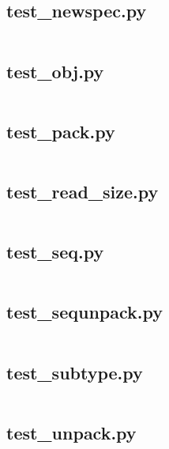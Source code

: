 \documentclass{article}
\begin{document}
\subsection{test\_newspec.py}
\inputminted{python}{/home/dufferzafar/dev/@clones/pandas/pandas/tests/io/msgpack/test_newspec.py}
\newpage

\subsection{test\_obj.py}
\inputminted{python}{/home/dufferzafar/dev/@clones/pandas/pandas/tests/io/msgpack/test_obj.py}
\newpage

\subsection{test\_pack.py}
\inputminted{python}{/home/dufferzafar/dev/@clones/pandas/pandas/tests/io/msgpack/test_pack.py}
\newpage

\subsection{test\_read\_size.py}
\inputminted{python}{/home/dufferzafar/dev/@clones/pandas/pandas/tests/io/msgpack/test_read_size.py}
\newpage

\subsection{test\_seq.py}
\inputminted{python}{/home/dufferzafar/dev/@clones/pandas/pandas/tests/io/msgpack/test_seq.py}
\newpage

\subsection{test\_sequnpack.py}
\inputminted{python}{/home/dufferzafar/dev/@clones/pandas/pandas/tests/io/msgpack/test_sequnpack.py}
\newpage

\subsection{test\_subtype.py}
\inputminted{python}{/home/dufferzafar/dev/@clones/pandas/pandas/tests/io/msgpack/test_subtype.py}
\newpage

\subsection{test\_unpack.py}
\inputminted{python}{/home/dufferzafar/dev/@clones/pandas/pandas/tests/io/msgpack/test_unpack.py}
\newpage
\end{document}
